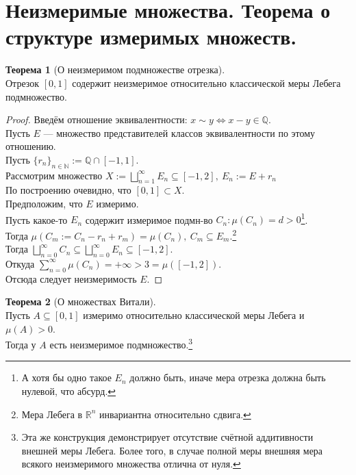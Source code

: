 \documentclass[11pt,a4paper]{report}
\def\Real{\mathbb{R}}
\def\Natural{\mathbb{N}}
\def\Rational{\mathbb{Q}}
\theoremstyle{definition}
\theoremstyle{definition}
\newtheorem{theorem}{Теорема}[section]
\theoremstyle{definition}
\begin{document}
	\section{Неизмеримые множества. Теорема о структуре измеримых множеств.}
	\begin{theorem}[О неизмеримом подмножестве отрезка]$  $\\
		Отрезок $ [0, 1] $ содержит неизмеримое относительно классической меры Лебега подмножество.
	\end{theorem}
	\begin{proof}
		Введём отношение эквивалентности: $ x \sim y \iff x - y \in \Rational $.\\
		Пусть $ E $ — множество представителей классов эквивалентности по этому отношению.\\
		Пусть $ \{r_{n}\}_{n \in \Natural} := \Rational \cap [-1, 1] $.\\ 
		Рассмотрим множество $ X := \bigsqcup\limits_{n=1}^{\infty} E_{n} \subseteq [-1, 2],\ E_{n} := E + r_{n} $\\
		По построению очевидно, что $ [0, 1] \subset X $.\\
		Предположим, что $ E $ измеримо.\\ 
		Пусть какое-то $ E_{n} $ содержит измеримое подмн-во $ C_{n}: \mu(C_{n}) = d > 0 $\footnote{А хотя бы одно такое $ E_{n} $ должно быть, иначе мера отрезка должна быть нулевой, что абсурд.}.\\
		Тогда $ \mu(C_{m} := C_{n} - r_{n} + r_{m}) = \mu(C_{n}),\ C_{m} \subseteq E_{m} $.\footnote{Мера Лебега в $ \Real^{n} $ инвариантна относительно сдвига.}\\
		Тогда $ \bigsqcup\limits_{n=0}^{\infty} C_{n} \subseteq \bigsqcup\limits_{n=0}^{\infty} E_{n} \subseteq [-1, 2] $.\\
		Откуда $ \sum\limits_{n=0}^{\infty} \mu(C_{n}) = +\infty > 3 = \mu([-1, 2]) $.\\
		Отсюда следует неизмеримость $ E $.
	\end{proof}
	\begin{theorem}[О множествах Витали]$  $\\
		Пусть $ A \subseteq [0, 1] $ измеримо относительно классической меры Лебега и $ \mu(A) > 0 $.\\ 
		Тогда у $ A $ есть неизмеримое подмножество.\footnote{Эта же конструкция демонстрирует отсутствие счётной аддитивности внешней меры Лебега. Более того, в случае полной меры внешняя мера всякого неизмеримого множества отлична от нуля.}
	\end{theorem}
\end{document}
